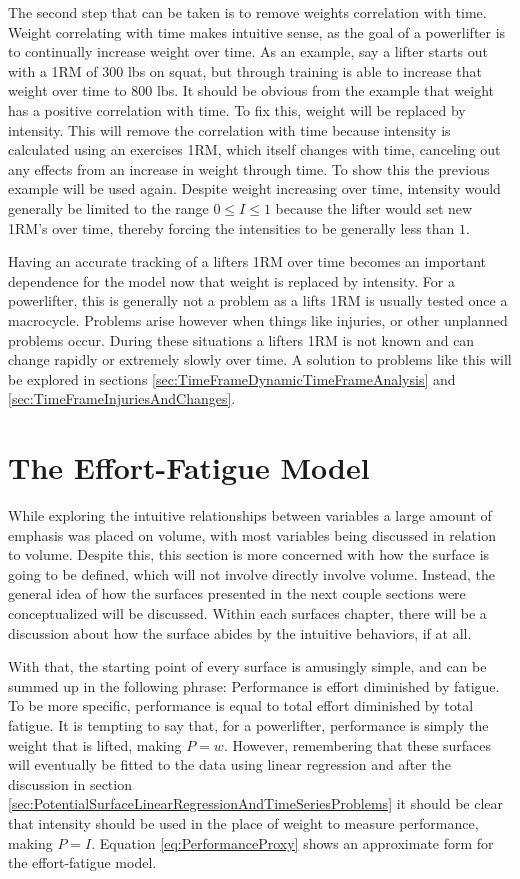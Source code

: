 The second step that can be taken is to remove weights correlation with time. Weight correlating with time makes intuitive sense, as the goal of a powerlifter is to continually increase weight over time. As an example, say a lifter starts out with a 1RM of $300$ lbs on squat, but through training is able to increase that weight over time to $800$ lbs. It should be obvious from the example that weight has a positive correlation with time. To fix this, weight will be replaced by intensity. This will remove the correlation with time because intensity is calculated using an exercises 1RM, which itself changes with time, canceling out any effects from an increase in weight through time. To show this the previous example will be used again. Despite weight increasing over time, intensity would generally be limited to the range $0\le I\le 1$ because the lifter would set new 1RM's over time, thereby forcing the intensities to be generally less than $1$.

Having an accurate tracking of a lifters 1RM over time becomes an important dependence for the model now that weight is replaced by intensity. For a powerlifter, this is generally not a problem as a lifts 1RM is usually tested once a macrocycle. Problems arise however when things like injuries, or other unplanned problems occur. During these situations a lifters 1RM is not known and can change rapidly or extremely slowly over time. A solution to problems like this will be explored in sections \ref{sec:TimeFrameDynamicTimeFrameAnalysis} and \ref{sec:TimeFrameInjuriesAndChanges}.


\section{The Effort-Fatigue Model}
\label{sec:PotentialSurfaceEffortFatigueModel}

While exploring the intuitive relationships between variables a large amount of emphasis was placed on volume, with most variables being discussed in relation to volume. Despite this, this section is more concerned with how the surface is going to be defined, which will not involve directly involve volume. Instead, the general idea of how the surfaces presented in the next couple sections were conceptualized will be discussed. Within each surfaces chapter, there will be a discussion about how the surface abides by the intuitive behaviors, if at all.

With that, the starting point of every surface is amusingly simple, and can be summed up in the following phrase: Performance is effort diminished by fatigue. To be more specific, performance is equal to total effort diminished by total fatigue. It is tempting to say that, for a powerlifter, performance is simply the weight that is lifted, making $P=w$. However, remembering that these surfaces will eventually be fitted to the data using linear regression and after the discussion in section \ref{sec:PotentialSurfaceLinearRegressionAndTimeSeriesProblems} it should be clear that intensity should be used in the place of weight to measure performance, making $P=I$. Equation \ref{eq:PerformanceProxy} shows an approximate form for the effort-fatigue model.

